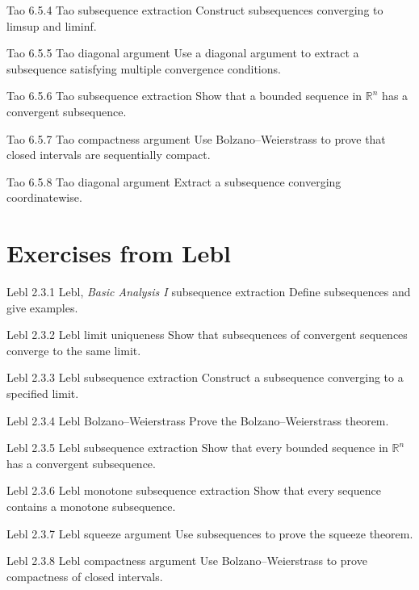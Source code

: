 \exstub
{Tao 6.5.4}
{Tao}
{subsequence extraction}
{Construct subsequences converging to limsup and liminf.}

\exstub
{Tao 6.5.5}
{Tao}
{diagonal argument}
{Use a diagonal argument to extract a subsequence satisfying
multiple convergence conditions.}

\exstub
{Tao 6.5.6}
{Tao}
{subsequence extraction}
{Show that a bounded sequence in $\mathbb{R}^n$
has a convergent subsequence.}

\exstub
{Tao 6.5.7}
{Tao}
{compactness argument}
{Use Bolzano–Weierstrass to prove that closed intervals are
sequentially compact.}

\exstub
{Tao 6.5.8}
{Tao}
{diagonal argument}
{Extract a subsequence converging coordinatewise.}


\section*{Exercises from Lebl}

\exstub
{Lebl 2.3.1}
{Lebl, \textit{Basic Analysis I}}
{subsequence extraction}
{Define subsequences and give examples.}

\exstub
{Lebl 2.3.2}
{Lebl}
{limit uniqueness}
{Show that subsequences of convergent sequences converge
to the same limit.}

\exstub
{Lebl 2.3.3}
{Lebl}
{subsequence extraction}
{Construct a subsequence converging to a specified limit.}

\exstub
{Lebl 2.3.4}
{Lebl}
{Bolzano–Weierstrass}
{Prove the Bolzano–Weierstrass theorem.}

\exstub
{Lebl 2.3.5}
{Lebl}
{subsequence extraction}
{Show that every bounded sequence in $\mathbb{R}^n$
has a convergent subsequence.}

\exstub
{Lebl 2.3.6}
{Lebl}
{monotone subsequence extraction}
{Show that every sequence contains a monotone subsequence.}

\exstub
{Lebl 2.3.7}
{Lebl}
{squeeze argument}
{Use subsequences to prove the squeeze theorem.}

\exstub
{Lebl 2.3.8}
{Lebl}
{compactness argument}
{Use Bolzano–Weierstrass to prove compactness of
closed intervals.}
